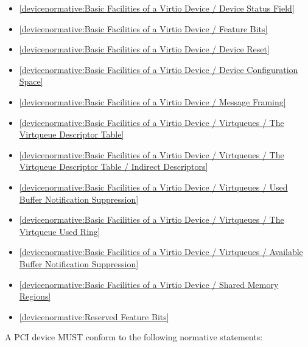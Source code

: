 \begin{itemize}
\item \ref{devicenormative:Basic Facilities of a Virtio Device / Device Status Field}
\item \ref{devicenormative:Basic Facilities of a Virtio Device / Feature Bits}
\item \ref{devicenormative:Basic Facilities of a Virtio Device / Device Reset}
\item \ref{devicenormative:Basic Facilities of a Virtio Device / Device Configuration Space}
\item \ref{devicenormative:Basic Facilities of a Virtio Device / Message Framing}
\item \ref{devicenormative:Basic Facilities of a Virtio Device / Virtqueues / The Virtqueue Descriptor Table}
\item \ref{devicenormative:Basic Facilities of a Virtio Device / Virtqueues / The Virtqueue Descriptor Table / Indirect Descriptors}
\item \ref{devicenormative:Basic Facilities of a Virtio Device / Virtqueues / Used Buffer Notification Suppression}
\item \ref{devicenormative:Basic Facilities of a Virtio Device / Virtqueues / The Virtqueue Used Ring}
\item \ref{devicenormative:Basic Facilities of a Virtio Device / Virtqueues / Available Buffer Notification Suppression}
\item \ref{devicenormative:Basic Facilities of a Virtio Device / Shared Memory Regions}
\item \ref{devicenormative:Reserved Feature Bits}
\end{itemize}

\label{sec:Conformance / Device Conformance / PCI Device Conformance}

A PCI device MUST conform to the following normative statements:

